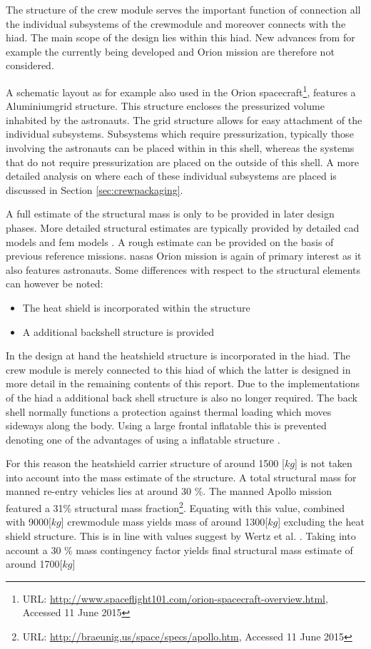 The structure of the crew module serves the important function of connection all the individual subsystems of the crewmodule and moreover connects with the \gls{hiad}. The main scope of the design lies within this \gls{hiad}. New advances from for example the currently being developed and Orion mission are therefore not considered.

A schematic layout as for example also used in the Orion spacecraft\footnote{URL: \url{http://www.spaceflight101.com/orion-spacecraft-overview.html}, Accessed 11 June 2015 }, features a Aluminiumgrid structure. This structure encloses the pressurized volume inhabited by the astronauts. The grid structure allows for easy attachment of the individual subsystems. Subsystems which require pressurization, typically those involving the astronauts can be placed within in this shell, whereas the systems that do not require pressurization are placed on the outside of this shell. A more detailed analysis on where each of these individual subsystems are placed is discussed in Section \ref{sec:crewpackaging}.


A full estimate of the structural mass is only to be provided in later design phases. More detailed structural estimates are typically provided by detailed \gls{cad} models and \gls{fem} models \cite{Wertz2011}. A rough estimate can be provided on the basis of previous reference missions. \glspl{nasa} Orion mission is again of primary interest as it also features astronauts. Some differences with respect to the structural elements can however be noted:

\begin{itemize}
\item The heat shield is incorporated within the structure
\item A additional backshell structure is provided
\end{itemize}


In the design at hand the heatshield structure is incorporated in the \gls{hiad}. The crew module is merely connected to this \gls{hiad} of which the latter is designed in more detail in the remaining contents of this report. Due to the implementations of the \gls{hiad} a additional back shell structure is also no longer required. The back shell normally functions a protection against thermal loading which moves sideways along the body. Using a large frontal inflatable this is prevented denoting one of the advantages of using a inflatable structure \cite{Hughes2005}.

For this reason the heatshield carrier structure of around 1500 [$kg$] \cite{Ainsworth2014} is not taken into account into the mass estimate of the structure. A total structural mass for manned re-entry vehicles lies at around 30 \%. The manned Apollo mission featured a 31\% structural mass fraction\footnote{URL: \url{http://braeunig.us/space/specs/apollo.htm}, Accessed 11 June 2015}. Equating with this value, combined with 9000[$kg$] crewmodule mass yields mass of around 1300[$kg$] excluding the heat shield structure. This is in line with values suggest by Wertz et al. \cite{Wertz2011}. Taking into account a 30 \% mass contingency factor yields final structural mass estimate of around 1700[$kg$]




